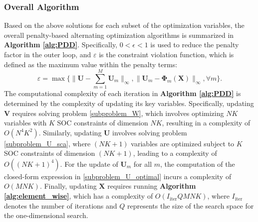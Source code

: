 \subsubsection{Overall Algorithm}
Based on the above solutions for each subset of the optimization variables, the overall penalty-based alternating optimization algorithms is summarized in \textbf{Algorithm \ref{alg:PDD}}. Specifically, $0< \epsilon < 1$ is used to reduce the penalty factor in the outer loop, and $\varepsilon$ is the constraint violation function, which is defined as the maximum value within the penalty terms:
\begin{equation}
    \varepsilon = \max \bigg\{ \| \mathbf{U} - \sum_{m=1}^M \mathbf{U}_m \|_{\infty}, \|\mathbf{U}_m -  \mathbf{\Phi}_m(\mathbf{X}) \|_{\infty}, \forall m \bigg\}.
\end{equation}
The computational complexity of each iteration in \textbf{Algorithm \ref{alg:PDD}} is determined by the complexity of updating its key variables. Specifically, updating $\mathbf{V}$ requires solving problem \eqref{subproblem_W}, which involves optimizing $NK$ variables with $K$ SOC constraints of dimension $NK$, resulting in a complexity of $O(N^4K^2)$. Similarly, updating $\mathbf{U}$ involves solving problem \eqref{subproblem_U_sca}, where $(NK+1)$ variables are optimized subject to $K$ SOC constraints of dimension $(NK+1)$, leading to a complexity of $O((NK+1)^4)$. For the update of $\mathbf{U}_m$ for all $m$, the computation of the closed-form expression in \eqref{subproblem_U_optimal} incurs a complexity of $O(MNK)$. Finally, updating $\mathbf{X}$ requires running \textbf{Algorithm \ref{alg:element_wise}}, which has a complexity of $O(I_{\mathrm{iter}} Q M N K)$, where $I_{\mathrm{iter}}$ denotes the number of iterations and $Q$ represents the size of the search space for the one-dimensional search.



